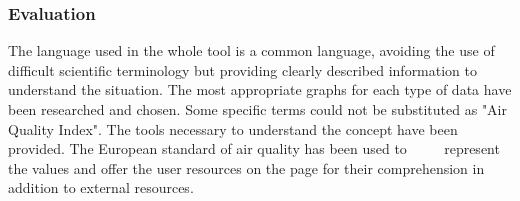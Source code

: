 \subsubsection*{Evaluation}  

\begin{itemize}
    \done The language used in the whole tool is a common language, avoiding the use of difficult scientific terminology but providing clearly described information to understand the situation.
    \done The most appropriate graphs for each type of data have been researched and chosen.
    \crossed Some specific terms could not be substituted as "Air Quality Index".
    \done The tools necessary to understand the concept have been provided. The European standard of air quality has been used to
         represent the values and offer the user resources on the page for their comprehension in addition to external resources.
\end{itemize}